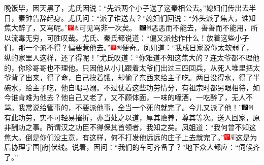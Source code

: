 晚饭毕，因天黑了，尤氏因说：``先派两个小子送了这秦相公去。''媳妇们传出去半日，秦钟告辞起身。尤氏问：``派了谁送去？''媳妇们回说：``外头派了焦大，谁知焦大醉了，又骂呢。''{{\includegraphics[width=3mm]{../Images/00002}\includegraphics[width=3mm]{../Images/00012}\footnotesize \kaishu 可见骂非一次矣。　}\includegraphics[width=3mm]{../Images/00006}\includegraphics[width=3mm]{../Images/00011}\footnotesize \kaishu 恶恶而不能去，善善而不能用，所以流毒无穷，可胜叹哉。}尤氏、秦氏都说道：``偏又派他作什么！放着这些小子们，那一个派不得？偏要惹他去。''{\includegraphics[width=3mm]{../Images/00002}\includegraphics[width=3mm]{../Images/00011}\footnotesize \kaishu 便奇。}凤姐道：``我成日家说你太软弱了，纵的家里人这样，还了得呢！''尤氏叹道：``你难道不知这焦大的？连太爷都不理他的，你珍哥哥也不理他。只因他从小儿跟着太爷们出过三四回兵，从死人堆里把太爷背了出来，得了命，自己挨着饿，却偷了东西来给主子吃。两日没得水，得了半碗水，给主子吃，他自喝马溺。不过仗着这些功劳情分，有祖宗时都另眼相待，如今谁肯难为他去？他自己又老了，又不顾体面，一味的噇酒，一吃醉了，无人不骂。我常说给管事的，不要派他事，全当一个死的就完了。今儿又派了他！''{\includegraphics[width=3mm]{../Images/00006}\includegraphics[width=3mm]{../Images/00011}\footnotesize \kaishu 有此功劳，实不可轻易摧折，亦当处之以道，厚其赡养，尊其等次。送人回家，原非酬功之事。所谓汉之功臣不得保其首领者，我知之矣。}凤姐道：``我何曾不知这焦大。倒是你们没主意，有这样，何不打发他远远的庄子上去就完了。''{\includegraphics[width=3mm]{../Images/00002}\includegraphics[width=3mm]{../Images/00010}\footnotesize \kaishu 这是为后协理宁国{[}府{]}伏线。}说着，因问：``我们的车可齐备了？''地下众人都应：``伺候齐了。''

